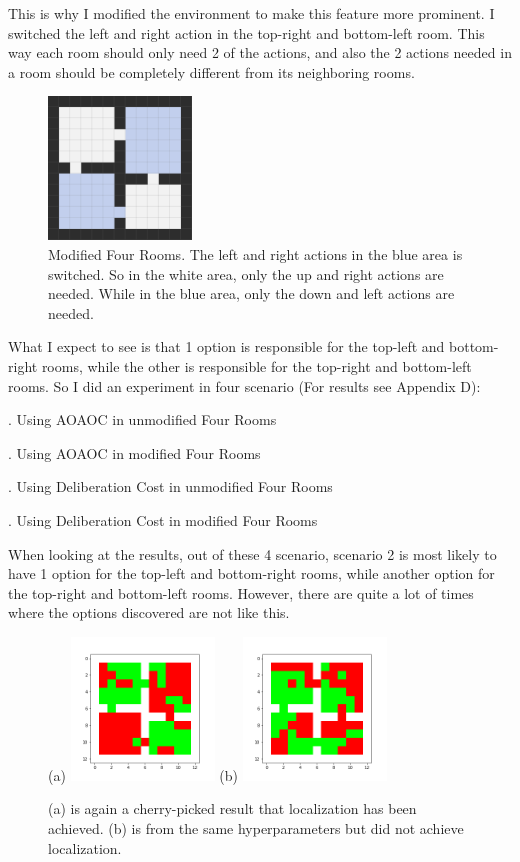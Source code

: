 \documentclass{article}
\begin{document}
	\quad This is why I modified the environment to make this feature more prominent. I switched the left and right action in the top-right and bottom-left room. This way each room should only need 2 of the actions, and also the 2 actions needed in a room should be completely different from its neighboring rooms.
	\begin{figure}[h]
		\centering
		\includegraphics[width=1.5in]{after.png}
		\caption{Modified Four Rooms. The left and right actions in the blue area is switched. So in the white area, only the up and right actions are needed. While in the blue area, only the down and left actions are needed.}
	\end{figure}

	\quad What I expect to see is that 1 option is responsible for the top-left and bottom-right rooms, while the other is responsible for the top-right and bottom-left rooms. So I did an experiment in four scenario (For results see Appendix D):
	
	. Using AOAOC in unmodified Four Rooms
	
	. Using AOAOC in modified Four Rooms
	
	. Using Deliberation Cost in unmodified Four Rooms
	
	. Using Deliberation Cost in modified Four Rooms
	
	\quad When looking at the results, out of these 4 scenario, scenario 2 is most likely to have 1 option for the top-left and bottom-right rooms, while another option for the top-right and bottom-left rooms. However, there are quite a lot of times where the options discovered are not like this.
	\begin{figure}[h]
		\centering
		\large{(a)}
		\includegraphics[width=1.5in]{goodPicked2.png}
		\hspace{0.2in}
		\large{(b)}
		\includegraphics[width=1.5in]{badPicked2.png}
		\caption{(a) is again a cherry-picked result that localization has been achieved. (b) is from the same hyperparameters but did not achieve localization.}
	\end{figure}
\end{document}
